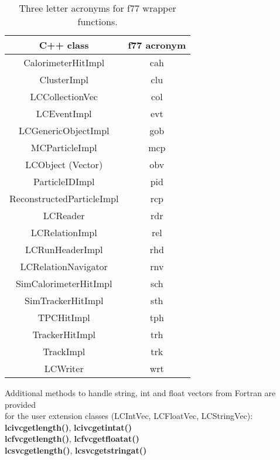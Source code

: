 \begin{table}
\begin{center}
\begin{tabular}{|c|c|}
\hline
\rule[-5mm]{0mm}{10mm} C++ class  &  f77 acronym   \\ \hline \hline

 CalorimeterHitImpl         & cah \\ \hline
 ClusterImpl                & clu \\ \hline
 LCCollectionVec            & col \\ \hline
 LCEventImpl                & evt \\ \hline
 LCGenericObjectImpl        & gob \\ \hline
 MCParticleImpl             & mcp \\ \hline
 LCObject (Vector)          & obv \\ \hline
 ParticleIDImpl             & pid \\ \hline
 ReconstructedParticleImpl  & rcp \\ \hline
 LCReader                   & rdr \\ \hline
 LCRelationImpl             & rel \\ \hline
 LCRunHeaderImpl            & rhd \\ \hline
 LCRelationNavigator        & rnv \\ \hline
 SimCalorimeterHitImpl      & sch \\ \hline
 SimTrackerHitImpl          & sth \\ \hline
 TPCHitImpl                 & tph \\ \hline
 TrackerHitImpl             & trh \\ \hline
 TrackImpl                  & trk \\ \hline
 LCWriter                   & wrt \\ \hline

\end{tabular}
\end{center}
\caption{Three letter acronyms for f77 wrapper functions.}
\label{tab_f77}
\end{table}

Additional methods to handle string, int and float vectors from Fortran are provided\\
for the user extension classes (LCIntVec, LCFloatVec, LCStringVec):\\
{\bf lcivcgetlength()}, {\bf lcivcgetintat()}  \\
{\bf lcfvcgetlength()}, {\bf lcfvcgetfloatat()} \\
{\bf lcsvcgetlength()}, {\bf lcsvcgetstringat()}  \\

